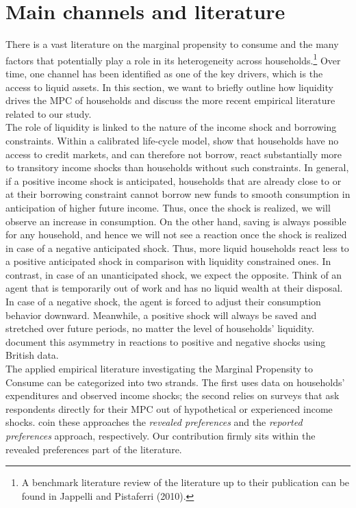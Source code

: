 \section{Main channels and literature} \label{sec:lit}
There is a vast literature on the marginal propensity to consume and the many factors that potentially play a role in its heterogeneity across households.\footnote{A benchmark literature review of the literature up to their publication can be found in Jappelli and Pistaferri (2010).} Over time, one channel has been identified as one of the key drivers, which is the access to liquid assets. In this section, we want to briefly outline how liquidity drives the MPC of households and discuss the more recent empirical literature related to our study. \\ 
The role of liquidity is linked to the nature of the income shock and borrowing constraints. Within a calibrated life-cycle model, \cite{kalpanviolante_2010} show that households have no access to credit markets, and can therefore not borrow, react substantially more to transitory income shocks than households without such constraints. In general, if a positive income shock is anticipated, households that are already close to or at their borrowing constraint cannot borrow new funds to smooth consumption in anticipation of higher future income. Thus, once the shock is realized, we will observe an increase in consumption. On the other hand, saving is always possible for any household, and hence we will not see a reaction once the shock is realized in case of a negative anticipated shock. Thus, more liquid households react less to a positive anticipated shock in comparison with liquidity constrained ones. In contrast, in case of an unanticipated shock, we expect the opposite. Think of an agent that is temporarily out of work and has no liquid wealth at their disposal. In case of a negative shock, the agent is forced to adjust their consumption behavior downward. Meanwhile, a positive shock will always be saved and stretched over future periods, no matter the level of households' liquidity. \cite{bunnetal_2018} document this asymmetry in reactions to positive and negative shocks using British data.\\
The applied empirical literature investigating the Marginal Propensity to Consume can be categorized into two strands. The first uses data on households' expenditures and observed income shocks; the second relies on surveys that ask respondents directly for their MPC out of hypothetical or experienced income shocks. \cite{parkersouleles_2019} coin these approaches the \textit{revealed preferences} and the \textit{reported preferences} approach, respectively. Our contribution firmly sits within the revealed preferences part of the literature. \\
